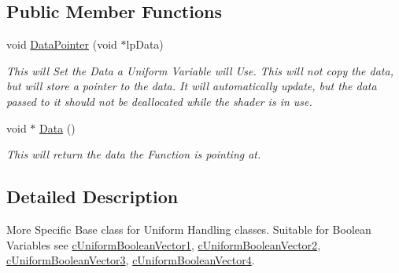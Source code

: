 \subsection*{Public Member Functions}
\begin{DoxyCompactItemize}
\item 
\hypertarget{classc_boolean_uniform_store_af080d19e87d31b65879ed4e2facd2330}{
void \hyperlink{classc_boolean_uniform_store_af080d19e87d31b65879ed4e2facd2330}{DataPointer} (void $\ast$lpData)}
\label{classc_boolean_uniform_store_af080d19e87d31b65879ed4e2facd2330}

\begin{DoxyCompactList}\small\item\em This will Set the Data a Uniform Variable will Use. This will not copy the data, but will store a pointer to the data. It will automatically update, but the data passed to it should not be deallocated while the shader is in use. \end{DoxyCompactList}\item 
\hypertarget{classc_boolean_uniform_store_aff9fe73a3d69767f766b706a07c66cbe}{
void $\ast$ \hyperlink{classc_boolean_uniform_store_aff9fe73a3d69767f766b706a07c66cbe}{Data} ()}
\label{classc_boolean_uniform_store_aff9fe73a3d69767f766b706a07c66cbe}

\begin{DoxyCompactList}\small\item\em This will return the data the Function is pointing at. \end{DoxyCompactList}\end{DoxyCompactItemize}


\subsection{Detailed Description}
More Specific Base class for Uniform Handling classes. Suitable for Boolean Variables see \hyperlink{classc_uniform_boolean_vector1}{cUniformBooleanVector1}, \hyperlink{classc_uniform_boolean_vector2}{cUniformBooleanVector2}, \hyperlink{classc_uniform_boolean_vector3}{cUniformBooleanVector3}, \hyperlink{classc_uniform_boolean_vector4}{cUniformBooleanVector4}. 